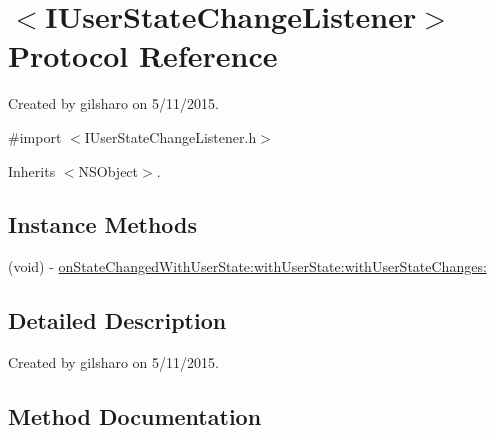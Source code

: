 \hypertarget{protocol_i_user_state_change_listener-p}{}\section{$<$I\+User\+State\+Change\+Listener$>$ Protocol Reference}
\label{protocol_i_user_state_change_listener-p}


Created by gilsharo on 5/11/2015.  




{\ttfamily \#import $<$I\+User\+State\+Change\+Listener.\+h$>$}



Inherits $<$\+N\+S\+Object$>$.

\subsection*{Instance Methods}
\begin{DoxyCompactItemize}
\item 
(void) -\/ \hyperlink{protocol_i_user_state_change_listener-p_a5fa6cb403a75a0be8b1a4f6ca8e322a2}{on\+State\+Changed\+With\+User\+State\+:with\+User\+State\+:with\+User\+State\+Changes\+:}
\end{DoxyCompactItemize}


\subsection{Detailed Description}
Created by gilsharo on 5/11/2015. 

\subsection{Method Documentation}
\hypertarget{protocol_i_user_state_change_listener-p_a5fa6cb403a75a0be8b1a4f6ca8e322a2}{}
